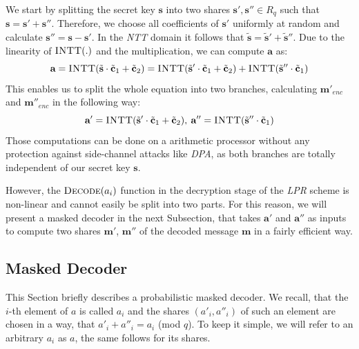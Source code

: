 We start by splitting the secret key \(\textbf{s}\) into two shares \(\textbf{s}',\textbf{s}'' \in R_q\) such that \(\textbf{s}=\textbf{s}'+\textbf{s}''\). Therefore, we choose all coefficients of \(\textbf{s}'\) uniformly at random and calculate \(\textbf{s}''=\textbf{s}-\textbf{s}'\). In the \textit{\ac{NTT}} domain it follows that \(\tilde{\textbf{s}}=\tilde{\textbf{s}}'+\tilde{\textbf{s}}''\). Due to the linearity of \(\textsc{INTT}(.)\) and the multiplication, we can compute \(\textbf{a}\) as:
\begin{equation}
	\textbf{a}=\textsc{INTT}(\tilde{\textbf{s}} \cdot \tilde{\textbf{c}}_1+\tilde{\textbf{c}}_2)=\textsc{INTT}(\tilde{\textbf{s}}' \cdot \tilde{\textbf{c}}_1+\tilde{\textbf{c}}_2)+\textsc{INTT}(\tilde{\textbf{s}}'' \cdot \tilde{\textbf{c}}_1)
\end{equation}
This enables us to split the whole equation into two branches, calculating \(\textbf{m}'_{enc}\) and \(\textbf{m}''_{enc}\) in the following way:
\begin{equation}
	\textbf{a}'=\textsc{INTT}(\tilde{\textbf{s}}' \cdot \tilde{\textbf{c}}_1+\tilde{\textbf{c}}_2),\:\textbf{a}''=\textsc{INTT}(\tilde{\textbf{s}}'' \cdot \tilde{\textbf{c}}_1)
\end{equation}
Those computations can be done on a arithmetic processor without any protection against side-channel attacks like \textit{\ac{DPA}}, as both branches are totally independent of our secret key \(\textbf{s}\).

However, the \(\textsc{Decode}(a_{i})\) function in the decryption stage of the \textit{\ac{LPR}} scheme is non-linear and cannot easily be split into two parts. For this reason, we will present a masked decoder in the next Subsection, that takes \(\textbf{a}'\) and \(\textbf{a}''\) as inputs to compute two shares \(\textbf{m}'\), \(\textbf{m}''\) of the decoded message \(\textbf{m}\) in a fairly efficient way.

\subsection{Masked Decoder}
This Section briefly describes a probabilistic masked decoder. We recall, that the \(i\)-th element of \(\textit{a}\) is called \(a_i\) and the shares \((a'_i,a''_i)\) of such an element are chosen in a way, that \(a'_i + a''_i = a_i\) (mod \(q\)). To keep it simple, we will refer to an arbitrary \(a_i\) as \(a\), the same follows for its shares.

